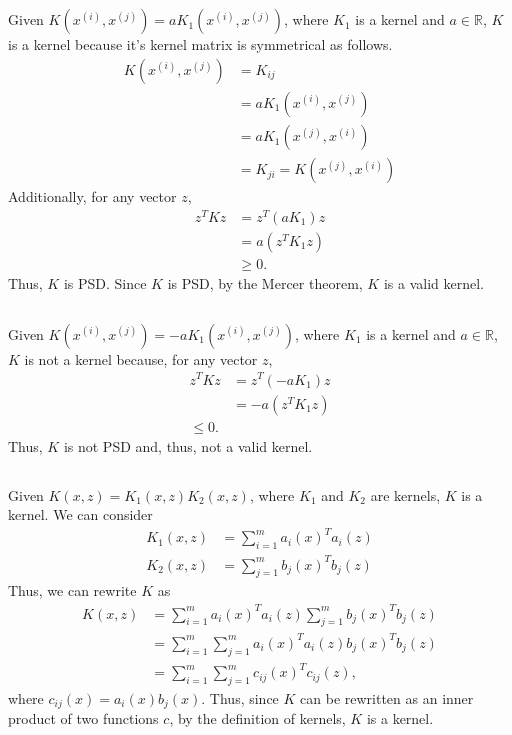\documentclass[11pt,a4paper,titlepage]{article}
\newcommand{\R}{\mathbb{R}}
\begin{document}
{\subsection{}{
\quad Given $K(x^{(i)}, x^{(j)}) = aK_1(x^{(i)}, x^{(j)})$, where $K_1$ is a kernel and $a\in\R$, $K$ is a kernel because it's kernel matrix is symmetrical as follows.
\begin{align*}
	K(x^{(i)}, x^{(j)}) &= K_{ij}
    \\ &= aK_1(x^{(i)}, x^{(j)})
    \\ &= aK_1(x^{(j)}, x^{(i)})
    \\ &= K_{ji} = K(x^{(j)}, x^{(i)})
\end{align*}
Additionally, for any vector $z$,
\begin{align}
	z^TKz &= z^T(aK_1)z
    \\ &= a(z^TK_1z)
	\\ &\geq 0.
\end{align}
Thus, $K$ is PSD. Since $K$ is PSD, by the Mercer theorem, $K$ is a valid kernel.
}\label{prob:1c}
\subsection{}{
\quad Given $K(x^{(i)}, x^{(j)}) = -aK_1(x^{(i)}, x^{(j)})$, where $K_1$ is a kernel and $a\in\R$, $K$ is not a kernel because, for any vector $z$, 
\begin{align*}
	z^TKz &= z^T(-aK_1)z
    \\ &= -a(z^TK_1z)
    \\ \leq 0.
\end{align*}
Thus, $K$ is not PSD and, thus, not a valid kernel.
}\label{prob:1d}
\subsection{}{
\quad Given $K(x, z) = K_1(x, z) K_2(x, z)$, where $K_1$ and $K_2$ are kernels, $K$ is a kernel. We can consider 
\begin{align}
	K_1(x, z) &= \sum_{i=1}^m a_i(x)^T a_i(z)
    \\K_2(x, z) &= \sum_{j=1}^m b_j(x)^T b_j(z)
\end{align}
Thus, we can rewrite $K$ as
\begin{align*}
	K(x, z) &= \sum_{i=1}^m a_i(x)^T a_i(z) \sum_{j=1}^m b_j(x)^T b_j(z)
    \\ &= \sum_{i=1}^m \sum_{j=1}^m a_i(x)^T a_i(z) b_j(x)^T b_j(z)
    \\ &= \sum_{i=1}^m \sum_{j=1}^m c_{ij}(x)^T c_{ij}(z),
\end{align*}
where $c_{ij}(x) = a_i(x) b_j(x)$. Thus, since $K$ can be rewritten as an inner product of two functions $c$, by the definition of kernels, $K$ is a kernel.
}\label{prob:1e}
}
\end{document}
